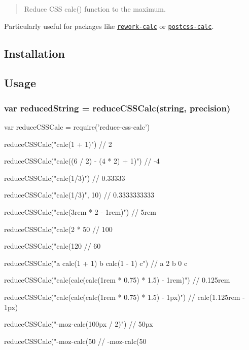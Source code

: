 \begin{quote}
Reduce C\+SS calc() function to the maximum. \end{quote}


Particularly useful for packages like \href{https://github.com/reworkcss/rework-calc}{\tt rework-\/calc} or \href{https://github.com/postcss/postcss-calc}{\tt postcss-\/calc}.

\subsection*{Installation}




\subsection*{Usage}

\subsubsection*{{\ttfamily var reduced\+String = reduce\+C\+S\+S\+Calc(string, precision)}}


\begin{DoxyCode}
var reduceCSSCalc = require('reduce-css-calc')

reduceCSSCalc("calc(1 + 1)")
// 2

reduceCSSCalc("calc((6 / 2) - (4 * 2) + 1)")
// -4

reduceCSSCalc("calc(1/3)")
// 0.33333

reduceCSSCalc("calc(1/3)", 10)
// 0.3333333333

reduceCSSCalc("calc(3rem * 2 - 1rem)")
// 5rem

reduceCSSCalc("calc(2 * 50%
// 100%

reduceCSSCalc("calc(120%
// 60%

reduceCSSCalc("a calc(1 + 1) b calc(1 - 1) c")
// a 2 b 0 c

reduceCSSCalc("calc(calc(calc(1rem * 0.75) * 1.5) - 1rem)")
// 0.125rem

reduceCSSCalc("calc(calc(calc(1rem * 0.75) * 1.5) - 1px)")
// calc(1.125rem - 1px)

reduceCSSCalc("-moz-calc(100px / 2)")
// 50px

reduceCSSCalc("-moz-calc(50%
// -moz-calc(50%
\end{DoxyCode}


